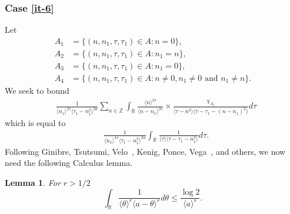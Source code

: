 \documentclass[12pt,reqno]{amsart}
\numberwithin{equation}{section}  %
\numberwithin{figure}{section}
\newcommand{\rr}{\mathbb{R}}
\newcommand{\zz}{\mathbb{Z}}
\theoremstyle{plain}
\newtheorem{lemma}{Lemma}
\theoremstyle{definition}
\theoremstyle{remark}
\begin{document}
 \subsubsection{Case \eqref{it-6}} 
\label{sssec:case-it-6}
Let 
%
%
\begin{align*}
A_1&=\{(n, n_1, \tau, \tau_1)\in A: n=0\},\\
A_2&=\{(n, n_1, \tau, \tau_1)\in A: n_1 = n \},\\
A_3&=\{(n, n_1, \tau, \tau_1)\in A: n_1=0 \},\\
A_4&=\{(n, n_1, \tau, \tau_1)\in A: n \neq 0, n_1 \neq 0 \text{ and } n_1 \neq n \}.
\end{align*} 
%
%
%
We seek to bound
\begin{equation*}
\begin{split}
  & \frac{1}{\langle n_{1} \rangle ^{2s}
  \langle \tau_{1} - n_{1}^{2} \rangle
  ^{2a}} \sum_{n \in \zz } \int_{\rr} \frac{\langle n \rangle ^{2s}}{\langle
  n - n_{1}\rangle ^{2s}}  \times \frac{\chi_{A_{1}}}{\langle
  \tau - n^{2}  \rangle  \langle \tau - \tau_{1} - (n - n_{1})^{2}
  \rangle } d \tau 
\end{split}
\end{equation*}
which is equal to 
%
\begin{equation}
  \label{case-1-term-1-reduc}
\begin{split}
  & \frac{1}{\langle n_{1} \rangle ^{4s}
  \langle \tau_{1} - n_{1}^{2} \rangle
  ^{2a}} \int_{\rr} \frac{1}{\langle
  \tau  \rangle  \langle \tau - \tau_{1} - n_{1}^{2}
  \rangle } d \tau.
\end{split}
\end{equation}
%
Following Ginibre, Tsutsumi, Velo~\cite{Ginibre:1997fk}, Kenig, Ponce, Vega~\cite{Kenig:1996aa}, and others,
we now need the following Calculus lemma.
%
%
%
%
%
%
%
\begin{lemma}
	\label{lem:calc}
 For $r > 1/2$
\begin{equation*}
  \int_{\rr} \frac{1} {\langle  \theta \rangle^{r} \langle  a - \theta
  \rangle^{r}} d \theta \leq\frac{\log 2} {\langle a \rangle^{r}}.
\end{equation*}
 \end{lemma}
\end{document}
